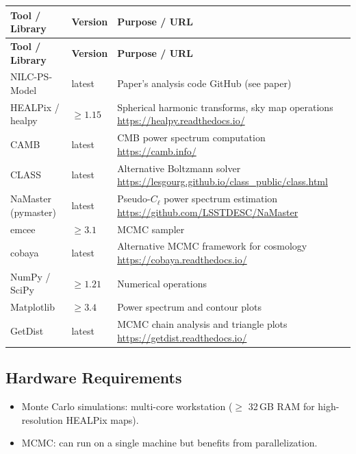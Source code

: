 \documentclass[11pt,a4paper]{article}
\begin{document}
\begin{longtable}{p{4.5cm} p{2.5cm} p{6.5cm}}
\toprule
\textbf{Tool / Library} & \textbf{Version} & \textbf{Purpose / URL} \\
\midrule
\endfirsthead
\toprule
\textbf{Tool / Library} & \textbf{Version} & \textbf{Purpose / URL} \\
\midrule
\endhead
NILC-PS-Model & latest & Paper's analysis code \newline GitHub (see paper) \\
\midrule
HEALPix / healpy & $\geq 1.15$ & Spherical harmonic transforms, sky map operations \newline \url{https://healpy.readthedocs.io/} \\
\midrule
CAMB & latest & CMB power spectrum computation \newline \url{https://camb.info/} \\
\midrule
CLASS & latest & Alternative Boltzmann solver \newline \url{https://lesgourg.github.io/class_public/class.html} \\
\midrule
NaMaster (pymaster) & latest & Pseudo-$C_\ell$ power spectrum estimation \newline \url{https://github.com/LSSTDESC/NaMaster} \\
\midrule
emcee & $\geq 3.1$ & MCMC sampler \\
\midrule
cobaya & latest & Alternative MCMC framework for cosmology \newline \url{https://cobaya.readthedocs.io/} \\
\midrule
NumPy / SciPy & $\geq 1.21$ & Numerical operations \\
\midrule
Matplotlib & $\geq 3.4$ & Power spectrum and contour plots \\
\midrule
GetDist & latest & MCMC chain analysis and triangle plots \newline \url{https://getdist.readthedocs.io/} \\
\bottomrule
\end{longtable}

\subsection{Hardware Requirements}
\begin{itemize}
  \item Monte Carlo simulations: multi-core workstation ($\geq$ 32\,GB RAM for high-resolution HEALPix maps).
  \item MCMC: can run on a single machine but benefits from parallelization.
\end{itemize}
\end{document}
